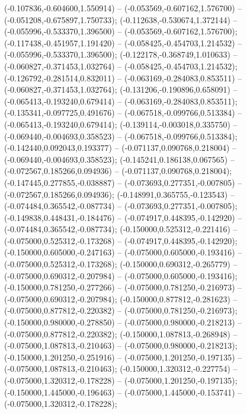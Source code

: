  (-0.107836,-0.604600,1.550914) -- (-0.053569,-0.607162,1.576700) -- (-0.051208,-0.675897,1.750733);
 (-0.112638,-0.530674,1.372144) -- (-0.055996,-0.533370,1.396500) -- (-0.053569,-0.607162,1.576700);
 (-0.117438,-0.451957,1.191420) -- (-0.058425,-0.454703,1.214532) -- (-0.055996,-0.533370,1.396500);
 (-0.122178,-0.368749,1.010633) -- (-0.060827,-0.371453,1.032764) -- (-0.058425,-0.454703,1.214532);
 (-0.126792,-0.281514,0.832011) -- (-0.063169,-0.284083,0.853511) -- (-0.060827,-0.371453,1.032764);
 (-0.131206,-0.190896,0.658091) -- (-0.065413,-0.193240,0.679414) -- (-0.063169,-0.284083,0.853511);
 (-0.135341,-0.097725,0.491676) -- (-0.067518,-0.099766,0.513384) -- (-0.065413,-0.193240,0.679414);
 (-0.139114,-0.003018,0.335750) -- (-0.069440,-0.004693,0.358523) -- (-0.067518,-0.099766,0.513384);
 (-0.142440,0.092043,0.193377) -- (-0.071137,0.090768,0.218004) -- (-0.069440,-0.004693,0.358523);
 (-0.145241,0.186138,0.067565) -- (-0.072567,0.185266,0.094936) -- (-0.071137,0.090768,0.218004);
 (-0.147445,0.277855,-0.038887) -- (-0.073693,0.277351,-0.007805) -- (-0.072567,0.185266,0.094936);
 (-0.148991,0.365755,-0.123543) -- (-0.074484,0.365542,-0.087734) -- (-0.073693,0.277351,-0.007805);
 (-0.149838,0.448431,-0.184476) -- (-0.074917,0.448395,-0.142920) -- (-0.074484,0.365542,-0.087734);
 (-0.150000,0.525312,-0.221416) -- (-0.075000,0.525312,-0.173268) -- (-0.074917,0.448395,-0.142920);
 (-0.150000,0.605000,-0.247163) -- (-0.075000,0.605000,-0.193416) -- (-0.075000,0.525312,-0.173268);
 (-0.150000,0.690312,-0.265779) -- (-0.075000,0.690312,-0.207984) -- (-0.075000,0.605000,-0.193416);
 (-0.150000,0.781250,-0.277266) -- (-0.075000,0.781250,-0.216973) -- (-0.075000,0.690312,-0.207984);
 (-0.150000,0.877812,-0.281623) -- (-0.075000,0.877812,-0.220382) -- (-0.075000,0.781250,-0.216973);
 (-0.150000,0.980000,-0.278850) -- (-0.075000,0.980000,-0.218213) -- (-0.075000,0.877812,-0.220382);
 (-0.150000,1.087813,-0.268948) -- (-0.075000,1.087813,-0.210463) -- (-0.075000,0.980000,-0.218213);
 (-0.150000,1.201250,-0.251916) -- (-0.075000,1.201250,-0.197135) -- (-0.075000,1.087813,-0.210463);
 (-0.150000,1.320312,-0.227754) -- (-0.075000,1.320312,-0.178228) -- (-0.075000,1.201250,-0.197135);
 (-0.150000,1.445000,-0.196463) -- (-0.075000,1.445000,-0.153741) -- (-0.075000,1.320312,-0.178228);
